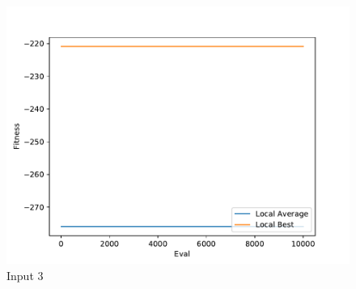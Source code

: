 \documentclass{standalone}
\begin{document}
\begin{figure}[!htb]
	\caption{Input 3}
	\label{fig:graph_3009}
	\includegraphics[width=\textwidth]{../graphs/graphs/3009.pdf}
\end{figure}
\end{document}
